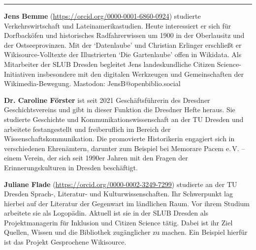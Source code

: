 \begin{center}\rule{0.5\linewidth}{0.5pt}\end{center}

\textbf{Jens Bemme} (\url{https://orcid.org/0000-0001-6860-0924}) studierte Verkehrswirtschaft und Lateinamerikastudien. Heute interessiert er sich für Dorfbacköfen und historisches Radfahrerwissen um 1900 in der Oberlausitz und der Ostseeprovinzen. Mit der \enquote*{Datenlaube} und Christian Erlinger erschließt er Wikisource-Volltexte der Illustrierten \enquote*{Die Gartenlaube} offen in Wikidata. Als Mitarbeiter der SLUB Dresden begleitet Jens landeskundliche Citizen Science-Initiativen insbesondere mit den digitalen Werkzeugen und Gemeinschaften der Wikimedia-Bewegung. Mastodon: JensB@openbiblio.social

\textbf{Dr. Caroline Förster} ist seit 2021 Geschäftsführerin des Dresdner Geschichtsvereins und gibt in dieser Funktion die Dresdner Hefte heraus. Sie studierte Geschichte und Kommunikationswissenschaft an der TU Dresden und arbeitete festangestellt und freiberuflich im Bereich der Wissenschaftskommunikation. Die promovierte Historikerin engagiert sich in verschiedenen Ehrenämtern, darunter zum Beispiel bei Memorare Pacem e.\,V. – einem Verein, der sich seit 1990er Jahren mit den Fragen der Erinnerungskulturen in Dresden beschäftigt.

\textbf{Juliane Flade} (\url{https://orcid.org/0000-0002-3249-7299}) studierte an der TU Dresden Sprach-, Literatur- und Kulturwissenschaften. Ihr Schwerpunkt lag hierbei auf der Literatur der Gegenwart im ländlichen Raum. Vor ihrem Studium arbeitete sie als Logopädin. Aktuell ist sie in der SLUB Dresden als Projektmanagerin für Inklusion und Citizen Science tätig. Dabei ist ihr Ziel Quellen, Wissen und die Bibliothek zugänglicher zu machen. Ein Beispiel hierfür ist das Projekt Gesprochene Wikisource.